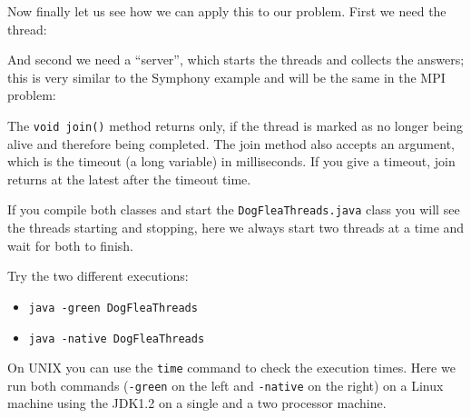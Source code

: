 Now finally let us see how we can apply this to our problem. First we need
the thread:

And second we need a ``server'', which starts the threads and collects
the answers; this is very similar to the Symphony example and will be
the same in the MPI problem:

The \verb|void join()| method returns only, if the thread is marked
as no longer being alive and therefore being completed. The join method
also accepts an argument, which is the timeout (a long variable) in milliseconds.
 If you give
a timeout, join returns at the latest after the timeout time.

If you compile both classes and start the \verb|DogFleaThreads.java| class
you will see the threads starting and stopping, here we always start two
threads at a time and wait for both to finish. 

Try the two different executions:
\begin{itemize}
\item \verb|java -green DogFleaThreads|
\item \verb|java -native DogFleaThreads|
\end{itemize}
On UNIX you can use the \verb|time| command to check the execution times.
Here we run both commands (\verb|-green| on the left and \verb|-native| on the right)
on a Linux machine using the JDK1.2 on a single
and a two processor machine.

